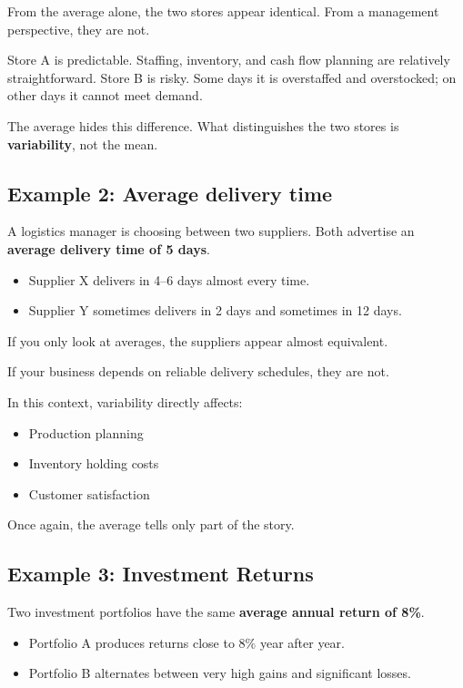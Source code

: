 \documentclass[
  12pt,
  letterpaper,
  DIV=11,
  numbers=noendperiod]{scrreprt}
\providecommand{\tightlist}{%
  \setlength{\itemsep}{0pt}\setlength{\parskip}{0pt}}
\begin{document}
From the average alone, the two stores appear identical. From a
management perspective, they are not.

Store A is predictable. Staffing, inventory, and cash flow planning are
relatively straightforward. Store B is risky. Some days it is
overstaffed and overstocked; on other days it cannot meet demand.

The average hides this difference. What distinguishes the two stores is
\textbf{variability}, not the mean.

\subsection{Example 2: Average delivery
time}\label{example-2-average-delivery-time}

A logistics manager is choosing between two suppliers. Both advertise an
\textbf{average delivery time of 5 days}.

\begin{itemize}
\tightlist
\item
  Supplier X delivers in 4--6 days almost every time.
\item
  Supplier Y sometimes delivers in 2 days and sometimes in 12 days.
\end{itemize}

If you only look at averages, the suppliers appear almost equivalent.

If your business depends on reliable delivery schedules, they are not.

In this context, variability directly affects:

\begin{itemize}
\tightlist
\item
  Production planning
\item
  Inventory holding costs
\item
  Customer satisfaction
\end{itemize}

Once again, the average tells only part of the story.

\subsection{Example 3: Investment
Returns}\label{example-3-investment-returns}

Two investment portfolios have the same \textbf{average annual return of
8\%}.

\begin{itemize}
\tightlist
\item
  Portfolio A produces returns close to 8\% year after year.
\item
  Portfolio B alternates between very high gains and significant losses.
\end{itemize}
\end{document}
